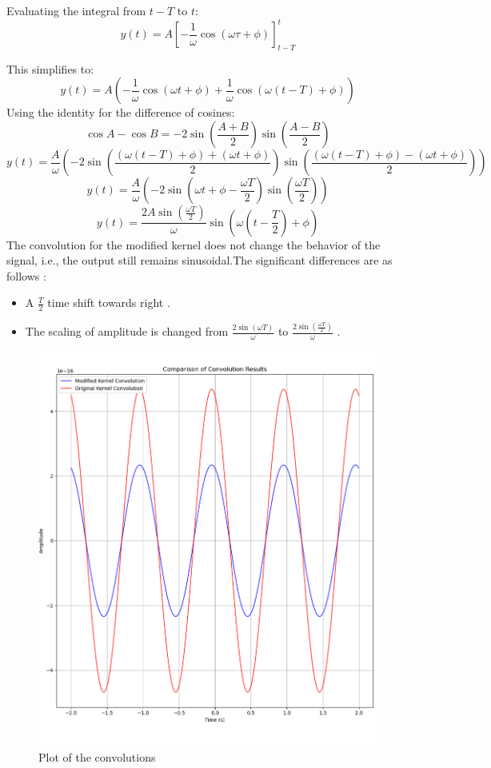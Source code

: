 Evaluating the integral from \( t - T \) to \( t \):
\[
y(t) = A \left[ -\frac{1}{\omega} \cos(\omega \tau + \phi) \right]_{t - T}^{t}
\]

This simplifies to:
\[
y(t) = A \left( -\frac{1}{\omega} \cos(\omega t + \phi) + \frac{1}{\omega} \cos(\omega (t - T) + \phi) \right)
\]
Using the identity for the difference of cosines:
\[
\cos A - \cos B = -2 \sin\left( \frac{A + B}{2} \right) \sin\left( \frac{A - B}{2} \right)
\]
\[
y(t) = \frac{A}{\omega} \left( -2 \sin \left( \frac{(\omega (t - T) + \phi) + (\omega t + \phi)}{2} \right) \sin \left( \frac{(\omega (t - T) + \phi) - (\omega t + \phi)}{2} \right) \right)
\]
\[
y(t) = \frac{A}{\omega} \left( -2 \sin \left( \omega t + \phi - \frac{\omega T}{2} \right) \sin \left( \frac{\omega T}{2} \right) \right)
\]
\[
\boxed{y(t) = \frac{2A \sin\left( \frac{\omega T}{2} \right)}{\omega} \sin \left( \omega( t  - \frac{T}{2}) + \phi \right)}
\]
The convolution for the modified kernel does not change the behavior of the signal, i.e., the output still remains sinusoidal.The significant differences are as follows :
\begin{itemize}
\item A $ \frac{T}{2} $ time shift towards right .

\item The scaling of amplitude is changed from $\frac{2\sin(\omega T)}{\omega}$ to $\frac{2\sin(\frac{\omega T}{2})}{\omega}$ .
\end{itemize}

\begin{figure}
    \centering
    \includegraphics[width=0.5\linewidth]{codes/codes_sin_2/figs/compare.png}
    \caption{Plot of the convolutions}
    \label{fig:enter-label}
\end{figure}

